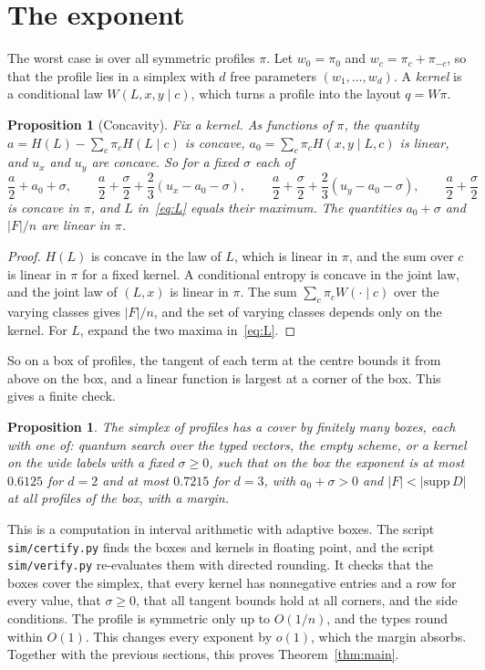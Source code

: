 \documentclass[11pt]{article}
\newtheorem{proposition}[theorem]{Proposition}
\theoremstyle{remark}
\begin{document}
\section{The exponent}\label{sec:exponent}

The worst case is over all symmetric profiles $\pi$. Let $w_0=\pi_0$ and $w_c=\pi_c+\pi_{-c}$, so that the profile lies in a simplex with $d$ free parameters $(w_1,\dots,w_d)$. A \emph{kernel} is a conditional law $W(L,x,y\mid c)$, which turns a profile into the layout $q=W\pi$.

\begin{proposition}[Concavity]\label{prop:concave}
Fix a kernel. As functions of $\pi$, the quantity $a=H(L)-\sum_c\pi_cH(L\mid c)$ is concave, $a_0=\sum_c\pi_cH(x,y\mid L,c)$ is linear, and $u_x$ and $u_y$ are concave. So for a fixed $\sigma$ each of
\[
\frac a2+a_0+\sigma,\qquad\frac a2+\frac\sigma2+\frac23(u_x-a_0-\sigma),\qquad\frac a2+\frac\sigma2+\frac23(u_y-a_0-\sigma),\qquad\frac a2+\frac\sigma2
\]
is concave in $\pi$, and $L$ in~\eqref{eq:L} equals their maximum. The quantities $a_0+\sigma$ and $|F|/n$ are linear in $\pi$.
\end{proposition}
\begin{proof}
$H(L)$ is concave in the law of $L$, which is linear in $\pi$, and the sum over $c$ is linear in $\pi$ for a fixed kernel. A conditional entropy is concave in the joint law, and the joint law of $(L,x)$ is linear in $\pi$. The sum $\sum_{c}\pi_cW(\cdot\mid c)$ over the varying classes gives $|F|/n$, and the set of varying classes depends only on the kernel. For $L$, expand the two maxima in~\eqref{eq:L}.
\end{proof}

So on a box of profiles, the tangent of each term at the centre bounds it from above on the box, and a linear function is largest at a corner of the box. This gives a finite check.

\begin{proposition}\label{prop:cert}
The simplex of profiles has a cover by finitely many boxes, each with one of: quantum search over the typed vectors, the empty scheme, or a kernel on the wide labels with a fixed $\sigma\ge0$, such that on the box the exponent is at most $0.6125$ for $d=2$ and at most $0.7215$ for $d=3$, with $a_0+\sigma>0$ and $|F|<|\mathrm{supp}\,D|$ at all profiles of the box, with a margin.
\end{proposition}

This is a computation in interval arithmetic with adaptive boxes. The script \texttt{sim/certify.py} finds the boxes and kernels in floating point, and the script \texttt{sim/verify.py} re-evaluates them with directed rounding. It checks that the boxes cover the simplex, that every kernel has nonnegative entries and a row for every value, that $\sigma\ge0$, that all tangent bounds hold at all corners, and the side conditions. The profile is symmetric only up to $O(1/n)$, and the types round within $O(1)$. This changes every exponent by $o(1)$, which the margin absorbs. Together with the previous sections, this proves Theorem~\ref{thm:main}.
\end{document}
